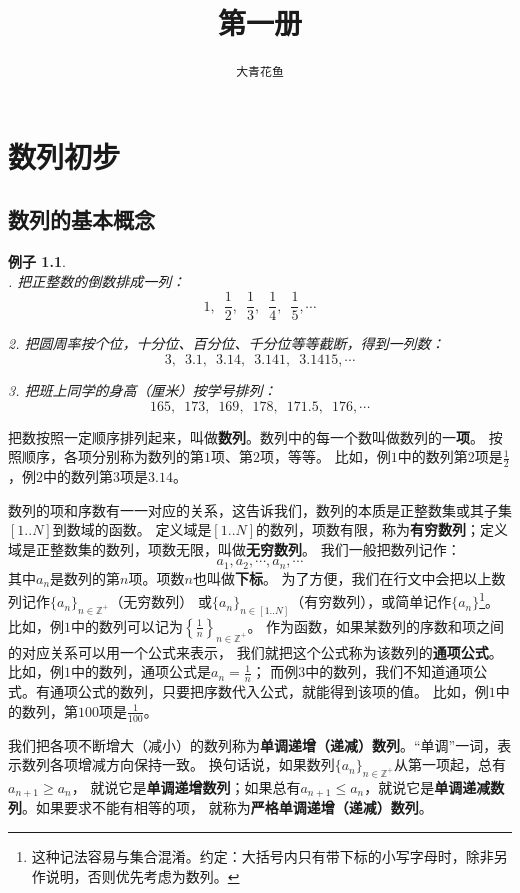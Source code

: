 \documentclass[12pt,UTF8]{ctexbook}
\title{\zihao{0} \bfseries 第一册}
\author{\zihao{2} \texttt{大青花鱼}}
\date{}
\newtheorem{ex}{例子}[section]
\begin{document}
\maketitle
\tableofcontents
\newpage

\chapter{数列初步}

\section{数列的基本概念}

\begin{ex}
    \mbox{}\\
    . 把正整数的倒数排成一列：
$$ 1,\,\,\, \frac{1}{2}, \,\,\, \frac{1}{3}, \,\,\,\frac{1}{4}, \,\,\,\frac{1}{5}, \cdots $$

2. 把圆周率按个位，十分位、百分位、千分位等等截断，得到一列数：
$$  3,\,\,\, 3.1,\,\,\, 3.14,\,\,\, 3.141,\,\,\, 3.1415, \cdots   $$

    3. 把班上同学的身高（厘米）按学号排列：
$$ 165,\,\,\, 173,\,\,\, 169,\,\,\, 178, \,\,\,171.5,\,\,\, 176, \cdots  $$
\end{ex}
把数按照一定顺序排列起来，叫做\textbf{数列}。数列中的每一个数叫做数列的一\textbf{项}。
按照顺序，各项分别称为数列的第$1$项、第$2$项，等等。
比如，例$1$中的数列第$2$项是$\frac{1}{2}$，例$2$中的数列第$3$项是$3.14$。

数列的项和序数有一一对应的关系，这告诉我们，数列的本质是正整数集或其子集$[1..N]$到数域的函数。
定义域是$[1..N]$的数列，项数有限，称为\textbf{有穷数列}；定义域是正整数集的数列，项数无限，叫做\textbf{无穷数列}。
我们一般把数列记作：
$$ a_1, a_2, \cdots, a_n, \cdots $$
其中$a_n$是数列的第$n$项。项数$n$也叫做\textbf{下标}。
为了方便，我们在行文中会把以上数列记作$\{a_n\}_{n\in\mathbb{Z}^+}$（无穷数列）
或$\{a_n\}_{n\in[1..N]}$（有穷数列），或简单记作$\{a_n\}$\footnote{这种记法容易与集合混淆。约定：大括号内只有带下标的小写字母时，除非另作说明，否则优先考虑为数列。}。
比如，例$1$中的数列可以记为$\left\{\frac{1}{n}\right\}_{n\in\mathbb{Z}^+}$。
作为函数，如果某数列的序数和项之间的对应关系可以用一个公式来表示，
我们就把这个公式称为该数列的\textbf{通项公式}。比如，例$1$中的数列，通项公式是$a_n = \frac{1}{n}$；
而例$3$中的数列，我们不知道通项公式。有通项公式的数列，只要把序数代入公式，就能得到该项的值。
比如，例$1$中的数列，第$100$项是$\frac{1}{100}$。

我们把各项不断增大（减小）的数列称为\textbf{单调递增（递减）数列}。“单调”一词，表示数列各项增减方向保持一致。
换句话说，如果数列$\{a_n\}_{n\in\mathbb{Z}^+}$从第一项起，总有$a_{n+1} \geqslant a_n$，
就说它是\textbf{单调递增数列}；如果总有$a_{n+1} \leqslant a_n$，就说它是\textbf{单调递减数列}。如果要求不能有相等的项，
就称为\textbf{严格单调递增（递减）数列}。
\end{document}
